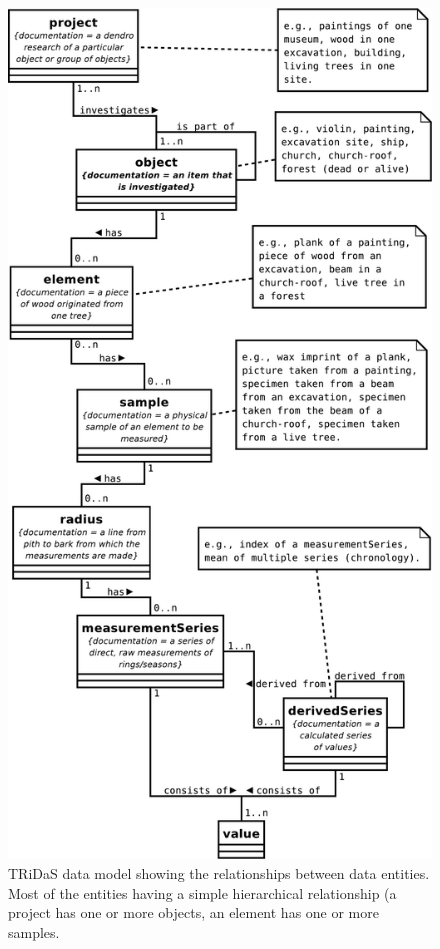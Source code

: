 \begin{figure}
\centering
\includegraphics[height=0.9\textheight]{Images/datamodel.pdf}
\caption{TRiDaS data model showing the relationships between data entities.  Most of the entities having a simple hierarchical relationship (a project has one or more objects, an element has one or more samples.} 
\label{fig:datamodel}
\end{figure}


